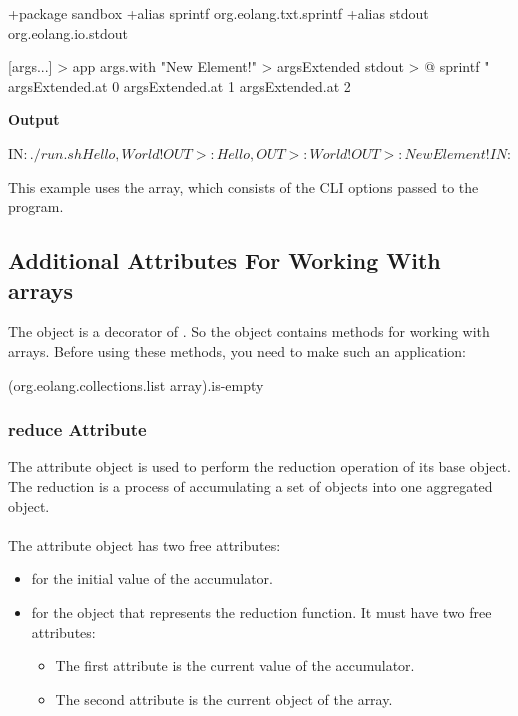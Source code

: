 \documentclass[12pt]{book}
\begin{document}
{{{\begin{ffcode}
+package sandbox
+alias sprintf org.eolang.txt.sprintf
+alias stdout org.eolang.io.stdout

[args...] > app
  args.with "New Element!" > argsExtended
  stdout > @
    sprintf
      "%
      argsExtended.at 0
      argsExtended.at 1
      argsExtended.at 2

\end{ffcode}
\textbf{Output}
\begin{ffcode}

IN$: ./run.sh Hello, World!
OUT>: Hello,
OUT>: World!
OUT>: New Element!
IN$: 
\end{ffcode}

This example uses the  array, which consists of the CLI options passed to the program.

\subsection{Additional Attributes For Working With arrays}

The object  is a decorator of . So the  object contains methods for working with arrays. Before using these methods, you need to make such an application:
\begin{ffcode}
    (org.eolang.collections.list array).is-empty
\end{ffcode}

\subsubsection{reduce Attribute}
The  attribute object is used to perform the reduction operation of its base  object. The reduction is a process of accumulating a set of objects into one aggregated object.
\\
\\
The  attribute object has two free attributes:
\begin{itemize}
    \item {} for the initial value of the accumulator.
    \item {} for the object that represents the reduction function. It must have two free attributes:
    \begin{itemize}
        \item The first attribute is the current value of the accumulator.
        \item The second attribute is the current object of the array.
    \end{itemize}
\end{itemize}

}}}
\end{document}

